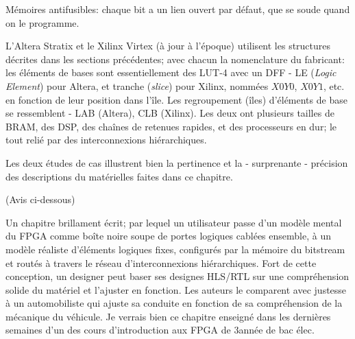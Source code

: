 Mémoires antifusibles: chaque bit a un lien ouvert par défaut, que se \og soude \fg quand on le programme.


L'Altera Stratix et le Xilinx Virtex (à jour à l'époque) utilisent les structures décrites dans les sections précédentes; avec chacun la nomenclature du fabricant: les éléments de bases sont essentiellement des LUT-4 avec un DFF - LE (\emph{Logic Element}) pour Altera, et tranche (\emph{slice}) pour Xilinx, nommées $X0Y0$, $X0Y1$, etc. en fonction de leur position dans l'île. Les regroupement (îles) d'éléments de base se ressemblent - LAB (Altera), CLB (Xilinx). Les deux ont plusieurs tailles de BRAM, des DSP, des chaînes de retenues rapides, et des processeurs en dur; le tout relié par des interconnexions hiérarchiques.

Les deux études de cas illustrent bien la pertinence et la - surprenante - précision des descriptions du matérielles faites dans ce chapitre.

 (Avis ci-dessous)

 Un chapitre brillament écrit; par lequel un utilisateur passe d'un modèle mental du FPGA comme boîte noire \og soupe de portes logiques \fg cablées ensemble, à un modèle réaliste d'éléments logiques fixes, configurés par la mémoire du bitstream et routés à travers le réseau d'interconnexions hiérarchiques. Fort de cette conception, un designer peut baser ses designes HLS/RTL sur une compréhension solide du matériel et l'ajuster en fonction. Les auteurs le comparent avec justesse à un automobiliste qui ajuste sa conduite en fonction de sa compréhension de la mécanique du véhicule. Je verrais bien ce chapitre enseigné dans les dernières semaines d'un des cours d'introduction aux FPGA de 3\ieme année de bac élec.

\clearpage
